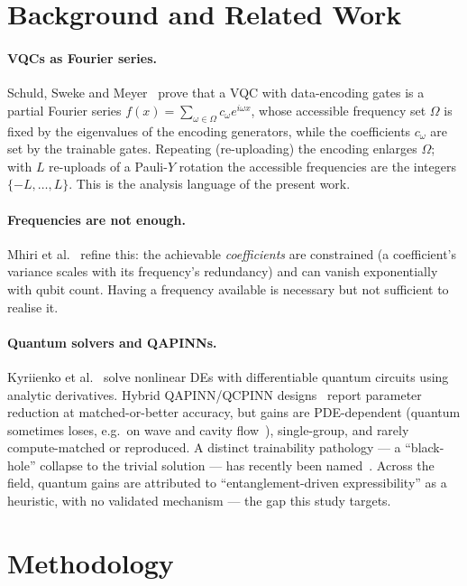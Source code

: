 \documentclass[11pt]{article}
\begin{document}
\section{Background and Related Work}
\paragraph{VQCs as Fourier series.} Schuld, Sweke and Meyer~\cite{schuld} prove
that a VQC with data-encoding gates is a partial Fourier series
$f(x)=\sum_{\omega\in\Omega}c_\omega e^{i\omega x}$, whose accessible frequency set
$\Omega$ is fixed by the eigenvalues of the encoding generators, while the
coefficients $c_\omega$ are set by the trainable gates. Repeating (re-uploading)
the encoding enlarges $\Omega$; with $L$ re-uploads of a Pauli-$Y$ rotation the
accessible frequencies are the integers $\{-L,\dots,L\}$. This is the analysis
language of the present work.

\paragraph{Frequencies are not enough.} Mhiri et al.~\cite{mhiri} refine this: the
achievable \emph{coefficients} are constrained (a coefficient's variance scales
with its frequency's redundancy) and can vanish exponentially with qubit count.
Having a frequency available is necessary but not sufficient to realise it.

\paragraph{Quantum solvers and QAPINNs.} Kyriienko et al.~\cite{dqc} solve
nonlinear DEs with differentiable quantum circuits using analytic derivatives.
Hybrid QAPINN/QCPINN designs~\cite{qapinn,qcpinn} report parameter reduction at
matched-or-better accuracy, but gains are PDE-dependent (quantum sometimes loses,
e.g.\ on wave and cavity flow~\cite{qcpinn}), single-group, and rarely
compute-matched or reproduced. A distinct trainability pathology --- a
``black-hole'' collapse to the trivial solution --- has recently been
named~\cite{maxwell}. Across the field, quantum gains are attributed to
``entanglement-driven expressibility'' as a heuristic, with no validated
mechanism --- the gap this study targets.

\section{Methodology}
\end{document}
